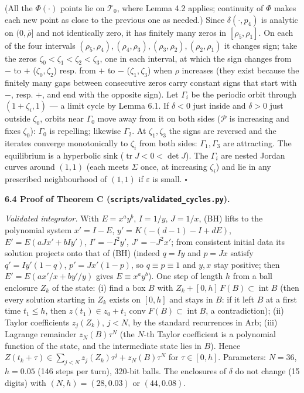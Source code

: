 \documentclass[11pt,a4paper]{report}
\begin{document}
(All the \(\Phi(\cdot)\) points lie on \(\mathcal T_0\), where Lemma 4.2 applies; continuity of \(\Phi\) makes each
new point as close to the previous one as needed.) Since \(\delta(\cdot,p_4)\) is analytic on \((0,\bar\rho]\) and
not identically zero, it has finitely many zeros in \([\rho_5,\rho_1]\). On each of the four intervals
\((\rho_5,\rho_4),(\rho_4,\rho_3),(\rho_3,\rho_2),(\rho_2,\rho_1)\) it changes sign; take the zeros
\(\zeta_0<\zeta_1<\zeta_2<\zeta_3\), one in each interval, at which the sign changes from \(-\) to \(+\)
(\(\zeta_0,\zeta_2\)) resp. from \(+\) to \(-\) (\(\zeta_1,\zeta_3\)) when \(\rho\) increases (they exist because the
finitely many gaps between consecutive zeros carry constant signs that start with \(-\), resp. \(+\), and end
with the opposite sign). Let \(\Gamma_i\) be the periodic orbit through \((1+\zeta_i,1)\) --- a limit cycle by Lemma 6.1.
If \(\delta<0\) just inside and \(\delta>0\) just outside \(\zeta_0\), orbits near \(\Gamma_0\) move away from it on
both sides (\(\mathcal P\) is increasing and fixes \(\zeta_0\)): \(\Gamma_0\) is repelling; likewise \(\Gamma_2\).
At \(\zeta_1,\zeta_3\) the signs are reversed and the iterates converge monotonically to \(\zeta_i\) from both sides:
\(\Gamma_1,\Gamma_3\) are attracting. The equilibrium is a hyperbolic sink (\(\operatorname{tr}J<0<\det J\)). The
\(\Gamma_i\) are nested Jordan curves around \((1,1)\) (each meets \(\Sigma\) once, at increasing \(\zeta_i\)) and lie
in any prescribed neighbourhood of \((1,1)\) if \(\varepsilon\) is small. \(\square\)

\textbf{6.4 Proof of Theorem C (\texttt{scripts/validated\_cycles.py}).}

\emph{Validated integrator.} With \(E=x^ay^b\), \(I=1/y\), \(J=1/x\), (BH) lifts to the polynomial system
\(x'=I-E\), \(y'=K(-(d-1)-I+dE)\), \(E'=E(aJx'+bIy')\), \(I'=-I^2y'\), \(J'=-J^2x'\); from consistent initial data
its solution projects onto that of (BH) (indeed \(q=Iy\) and \(p=Jx\) satisfy \(q'=Iy'(1-q)\), \(p'=Jx'(1-p)\), so
\(q\equiv p\equiv1\) and \(y,x\) stay positive; then \(E'=E(ax'/x+by'/y)\) gives \(E\equiv x^ay^b\)). One step of length
\(h\) from a ball enclosure \(Z_k\) of the state:
(i) find a box \(B\) with \(Z_k+[0,h]\,F(B)\subset\operatorname{int}B\) (then every solution starting in \(Z_k\)
exists on \([0,h]\) and stays in \(B\): if it left \(B\) at a first time \(t_1\le h\), then
\(z(t_1)\in z_0+t_1\operatorname{conv}F(B)\subset\operatorname{int}B\), a contradiction); (ii) Taylor
coefficients \(z_j(Z_k)\), \(j<N\), by the standard recurrences in Arb; (iii) Lagrange remainder
\(z_N(B)\tau^N\) (the \(N\)-th Taylor coefficient is a polynomial function of the state, and the intermediate
state lies in \(B\)). Hence \(Z(t_k+\tau)\in\sum_{j<N}z_j(Z_k)\tau^j+z_N(B)\tau^N\) for \(\tau\in[0,h]\). Parameters:
\(N=36\), \(h=0.05\) (146 steps per turn), 320-bit balls. The enclosures of \(\delta\) do not change (15 digits)
with \((N,h)=(28,0.03)\) or \((44,0.08)\).
\end{document}
